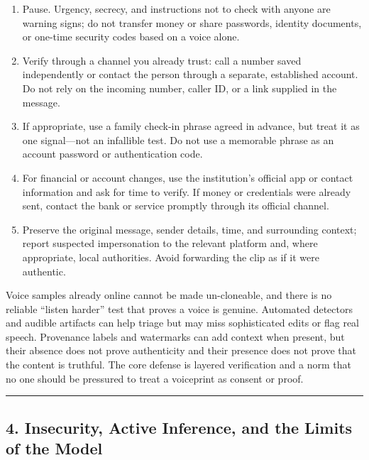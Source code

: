 \documentclass[
  11pt,
  letterpaper,
]{article}
\providecommand{\tightlist}{%
  \setlength{\itemsep}{0pt}\setlength{\parskip}{0pt}}
\begin{document}
\begin{enumerate}
\def\labelenumi{\arabic{enumi}.}
\tightlist
\item
  Pause. Urgency, secrecy, and instructions not to check with anyone are
  warning signs; do not transfer money or share passwords, identity
  documents, or one-time security codes based on a voice alone.
\item
  Verify through a channel you already trust: call a number saved
  independently or contact the person through a separate, established
  account. Do not rely on the incoming number, caller ID, or a link
  supplied in the message.
\item
  If appropriate, use a family check-in phrase agreed in advance, but
  treat it as one signal---not an infallible test. Do not use a
  memorable phrase as an account password or authentication code.
\item
  For financial or account changes, use the institution's official app
  or contact information and ask for time to verify. If money or
  credentials were already sent, contact the bank or service promptly
  through its official channel.
\item
  Preserve the original message, sender details, time, and surrounding
  context; report suspected impersonation to the relevant platform and,
  where appropriate, local authorities. Avoid forwarding the clip as if
  it were authentic.
\end{enumerate}

Voice samples already online cannot be made un-cloneable, and there is
no reliable ``listen harder'' test that proves a voice is genuine.
Automated detectors and audible artifacts can help triage but may miss
sophisticated edits or flag real speech. Provenance labels and
watermarks can add context when present, but their absence does not
prove authenticity and their presence does not prove that the content is
truthful. The core defense is layered verification and a norm that no
one should be pressured to treat a voiceprint as consent or proof.

\begin{center}\rule{0.5\linewidth}{0.5pt}\end{center}

\subsection{4. Insecurity, Active Inference, and the Limits of the
Model}\label{insecurity-active-inference-and-the-limits-of-the-model}
\end{document}
